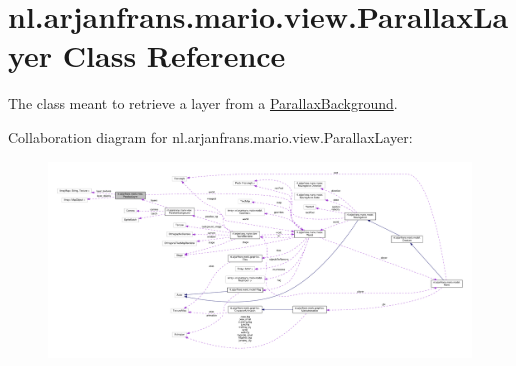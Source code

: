 \hypertarget{classnl_1_1arjanfrans_1_1mario_1_1view_1_1ParallaxLayer}{}\section{nl.\+arjanfrans.\+mario.\+view.\+Parallax\+Layer Class Reference}
\label{classnl_1_1arjanfrans_1_1mario_1_1view_1_1ParallaxLayer}


The class meant to retrieve a layer from a \hyperlink{classnl_1_1arjanfrans_1_1mario_1_1view_1_1ParallaxBackground}{Parallax\+Background}.  




Collaboration diagram for nl.\+arjanfrans.\+mario.\+view.\+Parallax\+Layer\+:
\nopagebreak
\begin{figure}[H]
\begin{center}
\leavevmode
\includegraphics[width=350pt]{classnl_1_1arjanfrans_1_1mario_1_1view_1_1ParallaxLayer__coll__graph}
\end{center}
\end{figure}
